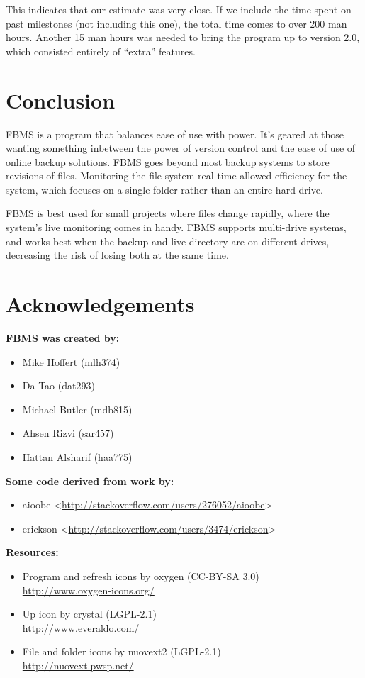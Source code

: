 \documentclass[12pt,a4paper]{article}
\newcommand\todonote[1]{{\color{red}\fbox{\parbox{\dimexpr\linewidth-2\fboxsep-2\fboxrule}{\textit\large{\textbf{TODO: #1}}}}}}
\begin{document}
This indicates that our estimate was very close. If we include the time spent on past milestones (not including this one), the total time comes to over 200 man hours. Another 15 man hours was needed to bring the program up to version 2.0, which consisted entirely of ``extra'' features. 

\todonote{Fill me out, yo!}

\section{Conclusion}
FBMS is a program that balances ease of use with power. It's geared at those wanting something inbetween the power of version control and the ease of use of online backup solutions. FBMS goes beyond most backup systems to store revisions of files. Monitoring the file system real time allowed efficiency for the system, which focuses on a single folder rather than an entire hard drive.

FBMS is best used for small projects where files change rapidly, where the system's live monitoring comes in handy. FBMS supports multi-drive systems, and works best when the backup and live directory are on different drives, decreasing the risk of losing both at the same time. 

\section{Acknowledgements}
\textbf{FBMS was created by:}
\begin{itemize}
\item Mike Hoffert (mlh374)
\item Da Tao (dat293)
\item Michael Butler (mdb815)
\item Ahsen Rizvi (sar457)
\item Hattan Alsharif (haa775)
\end{itemize}

\textbf{Some code derived from work by:}
\begin{itemize}
\item aioobe <\url{http://stackoverflow.com/users/276052/aioobe}>
\item erickson <\url{http://stackoverflow.com/users/3474/erickson}>
\end{itemize}

\textbf{Resources:}
\begin{itemize}
\item Program and refresh icons by oxygen (CC-BY-SA 3.0) \\
\url{http://www.oxygen-icons.org/}
\item Up icon by crystal (LGPL-2.1) \\
\url{http://www.everaldo.com/}
\item File and folder icons by nuovext2 (LGPL-2.1) \\
\url{http://nuovext.pwsp.net/}
\end{itemize}
\end{document}
